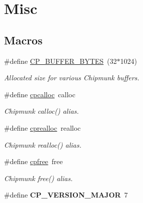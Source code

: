 \hypertarget{group__misc}{}\section{Misc}
\label{group__misc}
\subsection*{Macros}
\begin{DoxyCompactItemize}
\item 
\mbox{\label{group__misc_ga6d034fec4d7962b6f20f9e243527c560}} 
\#define \mbox{\hyperlink{group__misc_ga6d034fec4d7962b6f20f9e243527c560}{C\+P\+\_\+\+B\+U\+F\+F\+E\+R\+\_\+\+B\+Y\+T\+ES}}~(32$\ast$1024)
\begin{DoxyCompactList}\small\item\em Allocated size for various Chipmunk buffers. \end{DoxyCompactList}\item 
\mbox{\label{group__misc_gac88bab87ecc7db6cc222679bf6082e9b}} 
\#define \mbox{\hyperlink{group__misc_gac88bab87ecc7db6cc222679bf6082e9b}{cpcalloc}}~calloc
\begin{DoxyCompactList}\small\item\em Chipmunk calloc() alias. \end{DoxyCompactList}\item 
\mbox{\label{group__misc_gab3544b888840ed34e49bb0559d6849a8}} 
\#define \mbox{\hyperlink{group__misc_gab3544b888840ed34e49bb0559d6849a8}{cprealloc}}~realloc
\begin{DoxyCompactList}\small\item\em Chipmunk realloc() alias. \end{DoxyCompactList}\item 
\mbox{\label{group__misc_ga14627263deb67605201281bac734eb04}} 
\#define \mbox{\hyperlink{group__misc_ga14627263deb67605201281bac734eb04}{cpfree}}~free
\begin{DoxyCompactList}\small\item\em Chipmunk free() alias. \end{DoxyCompactList}\item 
\mbox{\label{group__misc_gac02132b57a51a1c26ff6fb11dc046c04}} 
\#define {\bfseries C\+P\+\_\+\+V\+E\+R\+S\+I\+O\+N\+\_\+\+M\+A\+J\+OR}~7

\end{DoxyCompactItemize}
